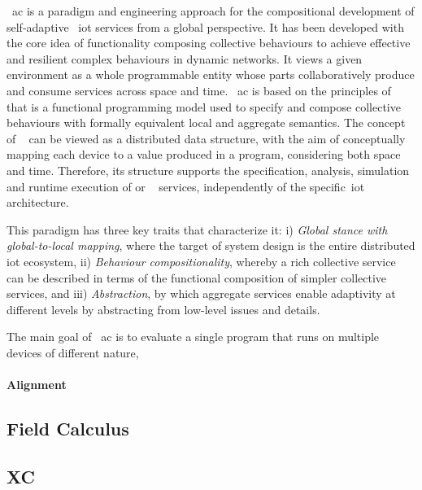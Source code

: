 ~\ac{ac} is a paradigm and engineering approach for the compositional development of self-adaptive
~\ac{iot} services from a global perspective.
It has been developed with the core idea of functionality
composing collective behaviours to achieve effective and resilient
complex behaviours in dynamic networks.
It views a given environment as a whole programmable entity whose parts collaboratively produce and consume services
across space and time.
~\ac{ac} is based on the principles of ~ that is a functional programming model used to specify
and compose collective behaviours with formally equivalent local and aggregate semantics.
The concept of ~ can be viewed as a distributed data structure,
with the aim of conceptually mapping each device to a value produced in a program, considering both
space and time.
Therefore, its structure supports the specification, analysis, simulation and runtime execution of 
or ~ services, independently of the specific~\ac{iot} architecture.

This paradigm has three key traits that characterize it:
    i) \emph{Global stance with global-to-local mapping}, where the target of system design is the entire distributed
        \ac{iot} ecosystem,
    ii) \emph{Behaviour compositionality}, whereby a rich collective service can be described in terms of the functional
        composition of simpler collective services, and
    iii) \emph{Abstraction}, by which aggregate services enable adaptivity at different levels by abstracting from low-level
        issues and details.


The main goal of ~\ac{ac} is to evaluate a single program that runs on multiple devices of different nature,

\paragraph{Alignment}

\subsection{Field Calculus}
\label{subsec:field-calculus}

\subsection{XC}
\label{subsec:xc}


